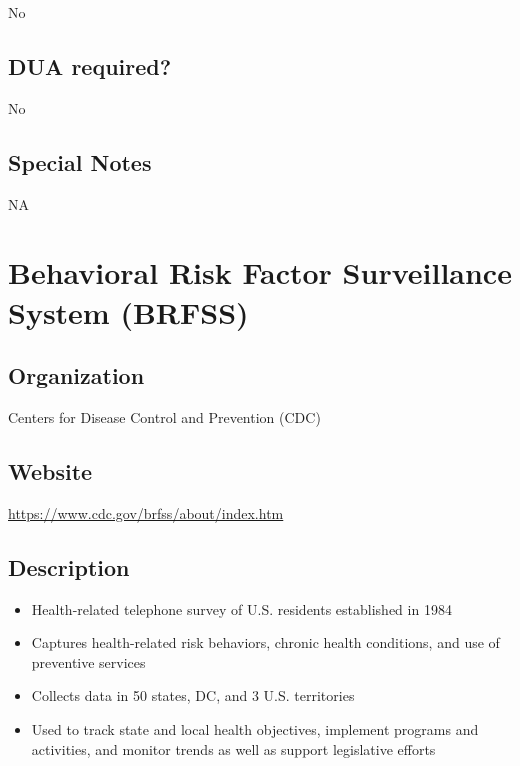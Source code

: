 \documentclass[
]{book}
\providecommand{\tightlist}{%
  \setlength{\itemsep}{0pt}\setlength{\parskip}{0pt}}
\begin{document}
No

\hypertarget{dua-required-11}{%
\section{DUA required?}\label{dua-required-11}}

No

\hypertarget{special-notes-11}{%
\section{Special Notes}\label{special-notes-11}}

NA

\mainmatter

\hypertarget{behavioral-risk-factor-surveillance-system-brfss}{%
\chapter{Behavioral Risk Factor Surveillance System (BRFSS)}\label{behavioral-risk-factor-surveillance-system-brfss}}

\hypertarget{organization-12}{%
\section{Organization}\label{organization-12}}

Centers for Disease Control and Prevention (CDC)

\hypertarget{website-12}{%
\section{Website}\label{website-12}}

\url{https://www.cdc.gov/brfss/about/index.htm}

\hypertarget{description-12}{%
\section{Description}\label{description-12}}

\begin{itemize}
\tightlist
\item
  Health-related telephone survey of U.S. residents established in 1984
\item
  Captures health-related risk behaviors, chronic health conditions, and use of preventive services
\item
  Collects data in 50 states, DC, and 3 U.S. territories
\item
  Used to track state and local health objectives, implement programs and activities, and monitor trends as well as support legislative efforts
\end{itemize}
\end{document}
